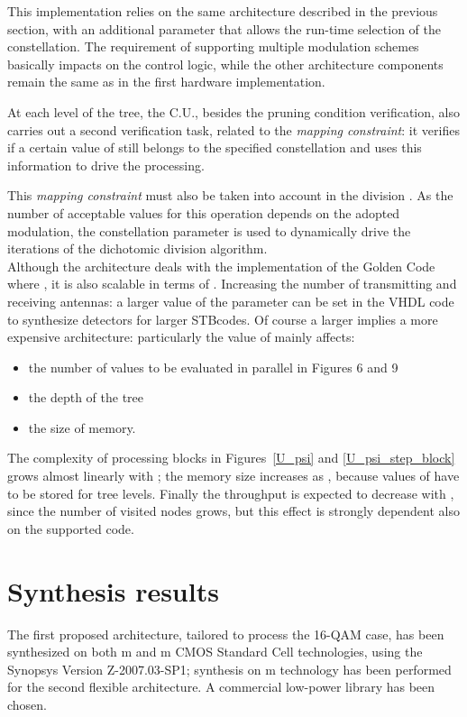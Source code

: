 \documentclass[12pt,onecolumn,draftclsnofoot]{IEEEtran}
\begin{document}
This implementation relies on the same architecture described in the previous 
section, with an additional parameter that allows the run-time selection of 
the constellation.
The requirement of supporting multiple modulation schemes basically impacts on 
the control logic, while the other architecture components remain the same as 
in the first hardware implementation.

At each level of the tree, the C.U., besides the pruning condition
verification, also carries out a second verification task, related to the {\it mapping constraint}:
it verifies if a certain value of  still belongs to the specified constellation
and uses this information to drive the processing.

This {\it mapping constraint} must also be taken into account in the
division . As the number of acceptable values for
this operation depends on the adopted modulation, 
the constellation parameter is used to dynamically drive the
iterations of the dichotomic division algorithm.\\

Although the architecture deals with the implementation of the Golden Code where ,
it is also scalable in terms of . Increasing the number of transmitting and 
receiving antennas: a larger value of the  parameter
can be set in the VHDL code to synthesize detectors for larger STBcodes. 
Of course a larger  implies a more expensive architecture: particularly
the value of  mainly affects:
\begin{itemize}
\item the number of  values to be evaluated in parallel in Figures 6 and 9
\item the depth of the tree 
\item the size of  memory.
\end{itemize}
The complexity of processing blocks in Figures~\ref{U_psi} and \ref{U_psi_step_block} 
grows almost linearly 
with ; the memory size increases as , because  values of  have to
be stored for  tree levels. Finally the throughput is expected to decrease
with , since the number of visited nodes grows, but this effect is strongly
dependent also on the supported code.


\section{Synthesis results}
\label{sec:Result}

The first proposed architecture, tailored to process the 16-QAM case,
has been synthesized on both m and m
CMOS Standard Cell technologies, using the Synopsys Version Z-2007.03-SP1; 
synthesis on m technology has been performed
for the second flexible architecture.
A commercial low-power library has been chosen.
\end{document}
